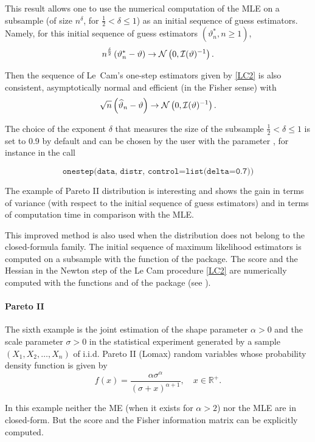 This result allows one to use the numerical computation of the MLE on a subsample (of size $n^\delta$, for $\frac12 < \delta \leq 1$) as an initial sequence of guess estimators. Namely, for this initial sequence of guess estimators $(\vartheta^*_n, n\geq 1)$, 
$$ n^{\frac{\delta}{2}} \left( \vartheta^*_n-\vartheta \right) \rightarrow {\cal N}\left(0,{\cal I}(\vartheta)^{-1}\right).$$

Then the sequence of Le~Cam's one-step estimators given by \eqref{LC2} is also consistent, asymptotically normal and efficient (in the Fisher sense) with
$$ \sqrt{n}\left( \widehat{\vartheta}_n-\vartheta \right) \rightarrow {\cal N}\left(0,{\cal I}(\vartheta)^{-1}\right).$$

The choice of the exponent $\delta$ that measures the size of the subsample $ \frac12 <\delta \leq 1$ is set to 0.9 by default and can be chosen by the user with the parameter , for instance in the call

$$\texttt{onestep(data, distr, control=list(delta=0.7))}$$


The example of Pareto II distribution is interesting and shows the gain in terms of variance (with respect to the initial sequence of guess estimators) and in terms of computation time in comparison with the MLE. 

This improved method is also used when the distribution does not belong to the closed-formula family. 
The initial sequence of maximum likelihood estimators is computed on a subsample with the  function of the  package. The score and the Hessian in the Newton step of the Le Cam procedure \eqref{LC2} are numerically 
computed with the functions  and  of the  
package (see \cite{numDeriv19}).


\paragraph{Pareto II}

The sixth example is the joint estimation of the shape parameter $\alpha>0$ and the scale parameter $\sigma>0$ in the statistical experiment generated by a sample $(X_1,X_2,\ldots,X_n)$ of i.i.d. Pareto II (Lomax) random variables whose probability density function is given by
$$ f(x)= \frac{\alpha \sigma^\alpha}{(\sigma + x)^{\alpha+1}}, \quad x \in \mathbb{R}^+.$$


In this example neither the ME (when it exists for $\alpha>2$) nor the MLE are in closed-form. But the score and the Fisher information matrix can be explicitly computed. 

